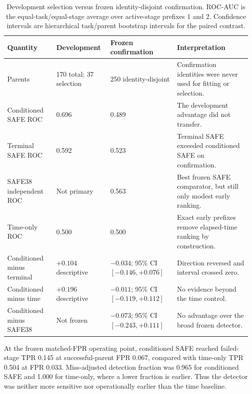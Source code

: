 \begin{table}[H]
\centering
\caption{Development selection versus frozen identity-disjoint confirmation. ROC-AUC is the equal-task/equal-stage average over active-stage prefixes 1 and 2. Confidence intervals are hierarchical task/parent bootstrap intervals for the paired contrast.}
\label{tab:phase1-confirmation}
\small
\begin{tabularx}{\textwidth}{P{0.24\textwidth}P{0.19\textwidth}P{0.21\textwidth}Y}
\toprule
Quantity & Development & Frozen confirmation & Interpretation \\
\midrule
Parents & 170 total; 37 selection & 250 identity-disjoint & Confirmation identities were never used for fitting or selection. \\
Conditioned SAFE ROC & 0.696 & 0.489 & The development advantage did not transfer. \\
Terminal SAFE ROC & 0.592 & 0.523 & Terminal SAFE exceeded conditioned SAFE on confirmation. \\
SAFE38 independent ROC & Not primary & 0.563 & Best frozen SAFE comparator, but still only modest early ranking. \\
Time-only ROC & 0.500 & 0.500 & Exact early prefixes remove elapsed-time ranking by construction. \\
Conditioned minus terminal & $+0.104$ descriptive & $-0.034$; 95\% CI $[-0.146,+0.076]$ & Direction reversed and interval crossed zero. \\
Conditioned minus time & $+0.196$ descriptive & $-0.011$; 95\% CI $[-0.119,+0.112]$ & No evidence beyond the time control. \\
Conditioned minus SAFE38 & Not frozen & $-0.073$; 95\% CI $[-0.243,+0.111]$ & No advantage over the broad frozen detector. \\
\bottomrule
\end{tabularx}
\end{table}

At the frozen matched-FPR operating point, conditioned SAFE reached failed-stage TPR 0.145 at successful-parent FPR 0.067, compared with time-only TPR 0.504 at FPR 0.033. Miss-adjusted detection fraction was 0.965 for conditioned SAFE and 1.000 for time-only, where a lower fraction is earlier. Thus the detector was neither more sensitive nor operationally earlier than the time baseline.


